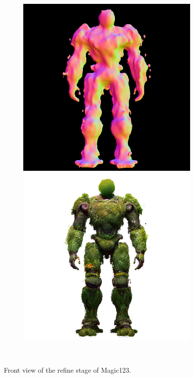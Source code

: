 \begin{figure}[H]
\begin{subfigure}[b]{0.25\textwidth}
        \caption{}
    \end{subfigure}
    \begin{subfigure}[b]{0.25\textwidth}
        \centering
        \fontsize{9pt}{7pt}\selectfont{}\vspace{.1cm}
        \includegraphics[width=\textwidth]{etc/a robot made out of plants/magic123/magic123_refine_robot_front_10000_part2.png}
        \includegraphics[width=\textwidth]{etc/a robot made out of plants/magic123/magic123_refine_robot_front_10000_part1.png}
        \caption{}
    \end{subfigure}
    \caption{Front view of the refine stage of Magic123.}~\label{fig:generationFrontRefineMagic123}
\end{figure}

